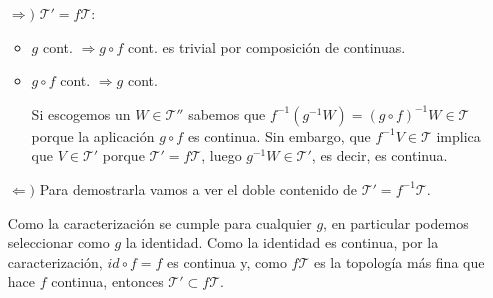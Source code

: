 \begin{demo}
\begin{itemize}
    \item[$\Rightarrow)$] $\mathcal{T}' = f\mathcal{T}: $
    \begin{itemize}
        \item $g$ cont. $\Rightarrow g \circ f$ cont. es trivial por composición de continuas.
        \item $g \circ f$ cont. $\Rightarrow g$ cont.
        
        Si escogemos un $W \in \mathcal{T}''$ sabemos que $f^{-1}\left( g^{-1} W \right) = \left( g \circ f \right)^{-1} W \in \mathcal{T}$ porque la aplicación $g\circ f$ es continua. Sin embargo, que $f^{-1} V \in \mathcal{T}$ implica que $V\in \mathcal{T}'$ porque $\mathcal{T}' = f\mathcal{T}$, luego $g^{-1}W \in \mathcal{T}'$, es decir, es continua.
    \end{itemize}

    \item[$\Leftarrow)$]
    Para demostrarla vamos a ver el doble contenido de $\mathcal{T}' = f^{-1}\mathcal{T}$.
    
    Como la caracterización se cumple para cualquier $g$, en particular podemos seleccionar como $g$ la identidad. Como la identidad es continua, por la caracterización, $id \circ f = f$ es continua y, como $f\mathcal{T}$ es la topología más fina que hace $f$ continua, entonces $\mathcal{T}'\subset f\mathcal{T}$.

    \begin{figure}[H]
        \centering    
    \end{figure}
    

\end{itemize}
\end{demo}
